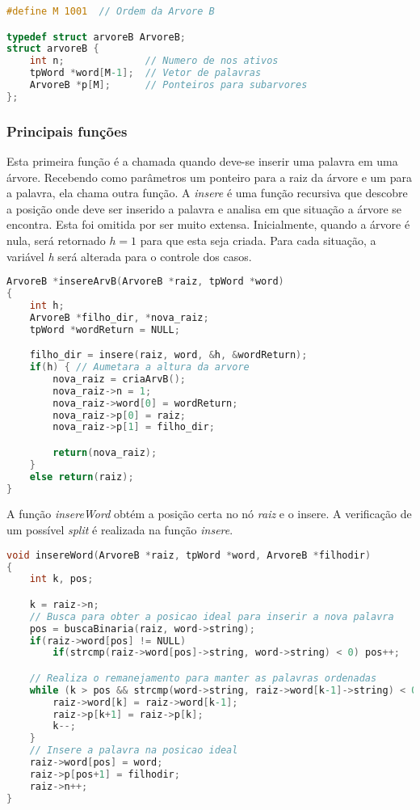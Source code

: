 \documentclass[
	11pt,				%
	oneside,			%
	a4paper,			%
	english,			%
	brazil,				%
	]{article}
\begin{document}
\begin{lstlisting}[language=C, caption=Estrutura da Árvore B]
#define M 1001	// Ordem da Arvore B

typedef struct arvoreB ArvoreB;
struct arvoreB {
    int n;              // Numero de nos ativos
    tpWord *word[M-1];  // Vetor de palavras
    ArvoreB *p[M];      // Ponteiros para subarvores
};
\end{lstlisting}

\subsubsection{Principais funções}
Esta primeira função é a chamada quando deve-se inserir uma palavra em uma árvore. Recebendo como parâmetros um ponteiro para a raiz da árvore e um para a palavra, ela chama outra função. A \textit{insere} é uma função recursiva que descobre a posição onde deve ser inserido a palavra e analisa em que situação a árvore se encontra. Esta foi omitida por ser muito extensa.
Inicialmente, quando a árvore é nula, será retornado $ h = 1 $ para que esta seja criada. Para cada situação, a variável \textit{h} será alterada para o controle dos casos.

\begin{lstlisting}[language=C, caption=Função de inserção de palavras]
ArvoreB *insereArvB(ArvoreB *raiz, tpWord *word)
{
    int h;
    ArvoreB *filho_dir, *nova_raiz;
    tpWord *wordReturn = NULL;

    filho_dir = insere(raiz, word, &h, &wordReturn);
    if(h) { // Aumetara a altura da arvore
        nova_raiz = criaArvB();
        nova_raiz->n = 1;
        nova_raiz->word[0] = wordReturn;
        nova_raiz->p[0] = raiz;
        nova_raiz->p[1] = filho_dir;

        return(nova_raiz);
    }
    else return(raiz);
}
\end{lstlisting}

A função \textit{insereWord} obtém a posição certa no nó \textit{raiz} e o insere. A verificação de um possível \textit{split} é realizada na função \textit{insere}.
\begin{lstlisting}[language=C, caption=Função inserir palavra em um nó]
void insereWord(ArvoreB *raiz, tpWord *word, ArvoreB *filhodir)
{
    int k, pos;

    k = raiz->n;
    // Busca para obter a posicao ideal para inserir a nova palavra
    pos = buscaBinaria(raiz, word->string);
    if(raiz->word[pos] != NULL)
        if(strcmp(raiz->word[pos]->string, word->string) < 0) pos++;

    // Realiza o remanejamento para manter as palavras ordenadas
    while (k > pos && strcmp(word->string, raiz->word[k-1]->string) < 0) {
        raiz->word[k] = raiz->word[k-1];
        raiz->p[k+1] = raiz->p[k];
        k--;
    }
    // Insere a palavra na posicao ideal
    raiz->word[pos] = word;
    raiz->p[pos+1] = filhodir;
    raiz->n++;
}
\end{lstlisting}
\end{document}
